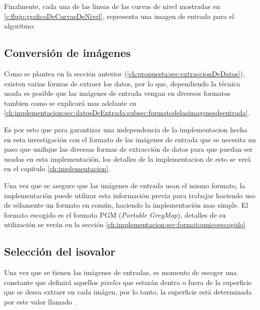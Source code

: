 Finalmente, cada una de las lineas de las curvas de nivel mostradas en \ref{c:flujo:graficoDeCurvasDeNivel}, representa una imagen de entrada para el algoritmo.

\subsection{Conversión de imágenes}
\label{ch:propuesta:sec:conversionDeImagenes}

Como se plantea en la sección anterior (\ref{ch:propuesta:sec:extraccionDeDatos}), existen varias formas de extraer los datos, por lo que, dependiendo la técnica usada es posible que las imágenes de entrada vengan en diversos formatos tambien como se explicará mas adelante en \ref{ch:implementacion:sec:datosDeEntrada:subsec:formatodelasimagenesdeentrada}.

Es por esto que para garantizar una independencia de la implementacion hecha en esta investigación con el formato de las imágenes de entrada que se necesita un paso que unifique las diversas formas de extracción de datos para que puedan ser usadas en esta implementación, los detalles de la implementacion de esto se verá en el capitulo \ref{ch:implementacion}.

Una vez que se asegure que las imágenes de entrada usan el mismo formato, la implementación puede utilizar esta información previa para trabajar haciendo uso de sólamente un formato en común, haciendo la implementación mas simple. El formato escogido es el formato PGM (\emph{Portable GreyMap}), detalles de su utilización se verán en la sección \ref{ch:implementacion:sec:formatounicoescogido}.

\subsection{Selección del isovalor}
\label{ch:propuesta:sec:seleccionDelIsovalor}

Una vez que se tienen las imágenes de entradas, es momento de escoger una constante que definirá aquellos \emph{pixeles} que estarán dentro o fuera de la superficie que se desea extraer en cada imágen, por lo tanto, la superficie está determinada por este valor llamado .

